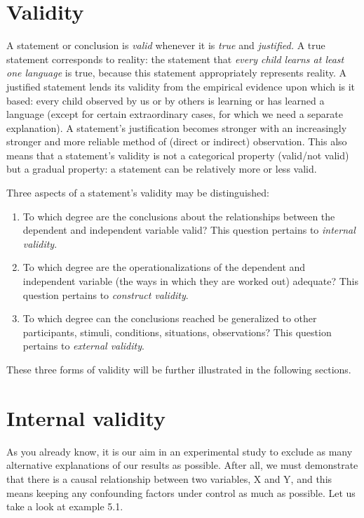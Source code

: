 \documentclass[
]{book}
\begin{document}
\hypertarget{sec:validity}{%
\section{Validity}\label{sec:validity}}

A statement or conclusion is \emph{valid} whenever it is \emph{true} and \emph{justified.} A true statement corresponds to reality: the statement that \emph{every child learns at least one language} is true, because this statement appropriately represents reality. A justified statement lends its validity from the empirical evidence upon which is it based: every child observed by us or by others is learning or has learned a language (except for certain extraordinary cases, for which we need a separate explanation). A statement's justification becomes stronger with an increasingly stronger and more reliable method of (direct or indirect) observation. This also means that a statement's validity is not a categorical property (valid/not valid) but a gradual property: a statement can be relatively more or less valid.

Three aspects of a statement's validity may be distinguished:

\begin{enumerate}
\def\labelenumi{\arabic{enumi}.}
\item
  To which degree are the conclusions about the relationships between the dependent and independent variable valid? This question pertains to \emph{internal validity}.
\item
  To which degree are the operationalizations of the dependent and independent variable (the ways in which they are worked out) adequate? This question pertains to \emph{construct validity}.
\item
  To which degree can the conclusions reached be generalized to other participants, stimuli, conditions, situations, observations? This question pertains to \emph{external validity}.
\end{enumerate}

These three forms of validity will be further illustrated in the following sections.

\hypertarget{sec:internalvalidity}{%
\section{Internal validity}\label{sec:internalvalidity}}

As you already know, it is our aim in an experimental study to exclude as many alternative explanations of our results as possible. After all, we must demonstrate that there is a causal relationship between two variables, X and Y, and this means keeping any confounding factors under control as much as possible. Let us take a look at example 5.1.
\end{document}
